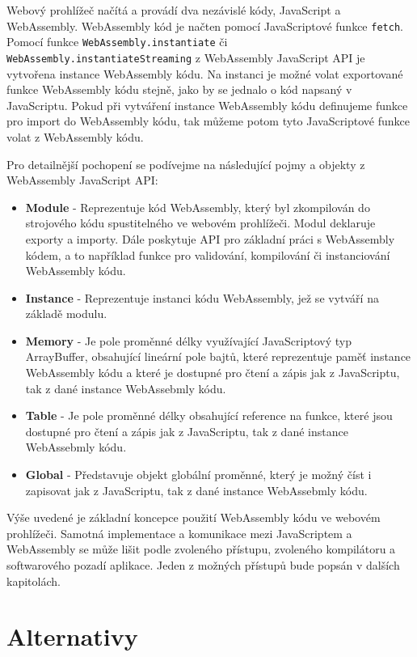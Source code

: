 \documentclass{{template/ctuthesis}}
\begin{document}
Webový prohlížeč načítá a provádí dva nezávislé kódy, JavaScript a WebAssembly. WebAssembly kód je načten pomocí JavaScriptové funkce \texttt{fetch}. Pomocí funkce \texttt{WebAssembly.instantiate} či \texttt{WebAssembly.instantiateStreaming} z WebAssembly JavaScript API \cite{wasm-js-api} je vytvořena instance WebAssembly kódu. Na instanci je možné volat exportované funkce WebAssembly kódu stejně, jako by se jednalo o kód napsaný v JavaScriptu. Pokud při vytváření instance WebAssembly kódu definujeme funkce pro import do WebAssembly kódu, tak můžeme potom tyto JavaScriptové funkce volat z WebAssembly kódu.

Pro detailnější pochopení se podívejme na následující pojmy a objekty z WebAssembly JavaScript API:

\begin{itemize}
    \item \textbf{Module} - Reprezentuje kód WebAssembly, který byl zkompilován do strojového kódu spustitelného ve webovém prohlížeči. Modul deklaruje exporty a importy. Dále poskytuje API pro základní práci s WebAssembly kódem, a to například funkce pro validování, kompilování či instanciování WebAssembly kódu.
    \item \textbf{Instance} - Reprezentuje instanci kódu WebAssembly, jež se vytváří na základě modulu.
    \item \textbf{Memory} - Je pole proměnné délky využívající JavaScriptový typ ArrayBuffer, obsahující lineární pole bajtů, které reprezentuje paměť instance WebAssembly kódu a které je dostupné pro čtení a zápis jak z JavaScriptu, tak z dané instance WebAssebmly kódu. 
    \item \textbf{Table} - Je pole proměnné délky obsahující reference na funkce, které jsou dostupné pro čtení a zápis jak z JavaScriptu, tak z dané instance WebAssebmly kódu.
    \item \textbf{Global} - Představuje objekt globální proměnné, který je možný číst i zapisovat jak z JavaScriptu, tak z dané instance WebAssebmly kódu. 
\end{itemize}

Výše uvedené je základní koncepce použití WebAssembly kódu ve webovém prohlížeči. Samotná implementace a komunikace mezi JavaScriptem a WebAssembly se může lišit podle zvoleného přístupu, zvoleného kompilátoru a softwarového pozadí aplikace. Jeden z možných přístupů bude popsán v dalších kapitolách.


\section{Alternativy}
\end{document}
